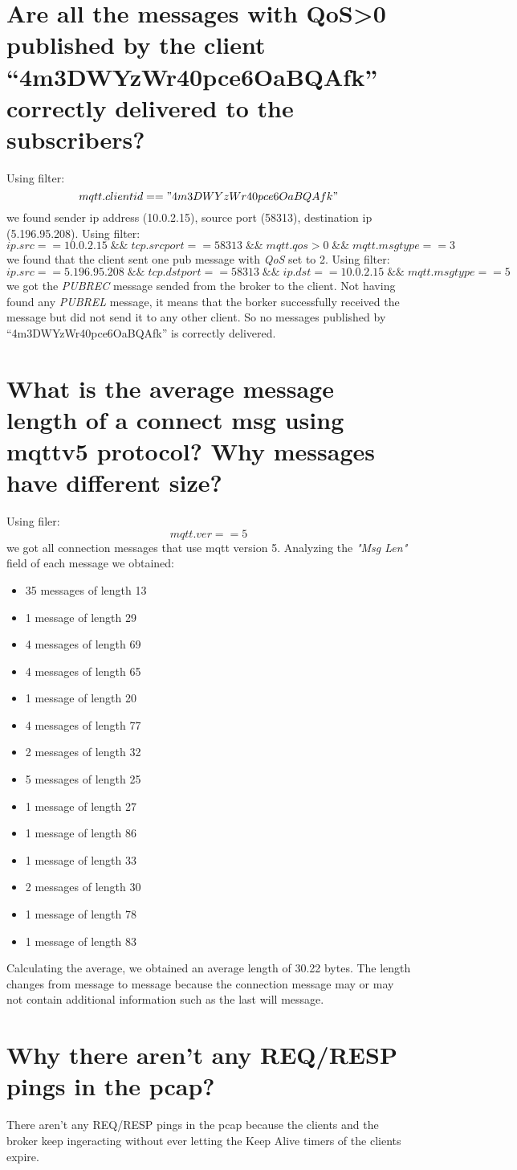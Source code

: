 \documentclass{article}
\begin{document}
\section{Are all the messages with QoS\textgreater  0 published by the
client \break“4m3DWYzWr40pce6OaBQAfk” correctly delivered
to the subscribers?}
Using filter: \[ mqtt.clientid == "4m3DWYzWr40pce6OaBQAfk"\] we found sender ip address (10.0.2.15), source port (58313), destination ip (5.196.95.208). \hfill \break
Using filter: \[ ip.src == 10.0.2.15 \; \&\& \; tcp.srcport == 58313 \; \&\& \; mqtt.qos > 0\; \&\& \; mqtt.msgtype == 3\] we found that the client sent one pub message with \textit{QoS} set to 2. \hfill \break
Using filter: \[ ip.src == 5.196.95.208 \; \&\& \; tcp.dstport == 58313 \; \&\& \; ip.dst == 10.0.2.15 \; \&\& \; mqtt.msgtype == 5\] we got the \textit{PUBREC} message sended from the broker to the client. \hfill \break
Not having found any \textit{PUBREL} message, it means that the borker successfully received the message but did not send it to any other client. So no messages published by “4m3DWYzWr40pce6OaBQAfk” is correctly delivered.


\section{What is the average message length of a connect msg
using mqttv5 protocol? Why messages have different
size?}
Using filer: \[ mqtt.ver == 5\] we got all connection messages that use mqtt version 5. \hfill \break
Analyzing the \textit{"Msg Len"} field of each message we obtained: 
\begin{itemize} 
   \item 35 messages of length 13
   \item 1 message of length 29
   \item 4 messages of length 69
   \item 4 messages of length 65
   \item 1 message of length 20
   \item 4 messages of length 77
   \item 2 messages of length 32
   \item 5 messages of length 25
   \item 1 message of length 27
   \item 1 message of length 86
   \item 1 message of length 33
   \item 2 messages of length 30
   \item 1 message of length 78
   \item 1 message of length 83
\end{itemize}
Calculating the average, we obtained an average length of 30.22 bytes. \hfill \break
The length changes from message to message because the connection message may or may not contain additional information such as the last will message.

\section{Why there aren’t any REQ/RESP pings in the pcap?}
There aren't any REQ/RESP pings in the pcap because the clients and the broker keep ingeracting without ever letting the Keep Alive timers of the clients expire.
\end{document}
